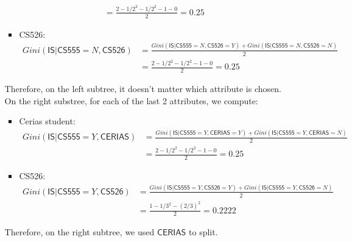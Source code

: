 \documentclass{article}
\begin{document}
\begin{enumerate}
\begin{enumerate}
\begin{itemize}
\begin{equation}
\begin{split}
             \\&= \frac{2-1/2^2 - 1/2^2 - 1-0}{2} = 0.25
             \end{split}
             \end{equation}
             \item CS526:
             \begin{equation}
             \begin{split}
             Gini(\mathsf{IS} |\mathsf{CS555} = N, \mathsf{CS526}) &= \frac{Gini(\mathsf{IS} | \mathsf{CS555} = N,\mathsf{CS526} = Y) + Gini(\mathsf{IS} |\mathsf{CS555} = N, \mathsf{CS526} = N)}{2}
             \\&= \frac{2-1/2^2 - 1/2^2 - 1-0}{2} = 0.25
             \end{split}
             \end{equation}
         \end{itemize}
         Therefore, on the left subtree, it doesn't matter which attribute is chosen.
         \\
         On the right substree, for each of the last 2 attributes,  we compute:
         \begin{itemize}
             \item Cerias student: 
             \begin{equation}
             \begin{split}
             Gini(\mathsf{IS} |\mathsf{CS555} = Y, \mathsf{CERIAS}) &= \frac{Gini(\mathsf{IS} | \mathsf{CS555} = Y,\mathsf{CERIAS} = Y) + Gini(\mathsf{IS} |\mathsf{CS555} = Y, \mathsf{CERIAS} = N)}{2}
             \\&= \frac{2-1/2^2 - 1/2^2 - 1-0}{2} = 0.25
             \end{split}
             \end{equation}
             \item CS526:
             \begin{equation}
             \begin{split}
             Gini(\mathsf{IS} |\mathsf{CS555} = Y, \mathsf{CS526}) &= \frac{Gini(\mathsf{IS} | \mathsf{CS555} = Y,\mathsf{CS526} = Y) + Gini(\mathsf{IS} |\mathsf{CS555} = Y, \mathsf{CS526} = N)}{2}
             \\&= \frac{1 - 1/3^2-(2/3)^2}{2} = 0.2222
             \end{split}
             \end{equation}
         \end{itemize}
        Therefore, on the right subtree,  we used $\mathsf{CERIAS}$ to split.

\end{enumerate}
\end{enumerate}
\end{document}

